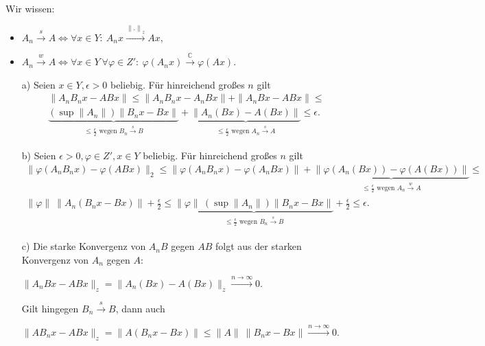 \begin{solution}
\leavevmode \\
  Wir wissen:
\begin{itemize}
    \item $A_n \xrightarrow{s} A \Leftrightarrow \forall x \in Y:~ A_nx \xrightarrow{\mathbb{ \| . \|}_z} Ax,$
    \item $A_n \xrightarrow{w} A \Leftrightarrow \forall x \in Y~ \forall \varphi \in Z':~ \varphi(A_nx) \xrightarrow{\mathbb{C}} \varphi(Ax)$.
\end{itemize}

\begin{itemize}
    \item [a)] Seien $x \in Y, \epsilon > 0$ beliebig. Für hinreichend großes $n$ gilt
    \begin{align*}
        \| A_n B_n x - ABx \| \leq \| A_n B_n x - A_n Bx \| + \| A_n Bx - ABx \| \leq \\
        \underbrace{(\sup{\| A_n \|}) \| B_n x - Bx \|}_{\substack{\leq
        \frac{\epsilon}{2}
        \text{~wegen~} B_n \xrightarrow{s} B}} +
        \underbrace{\| A_n(Bx) - A(Bx) \|}_{\substack{\leq \frac{\epsilon}{2} \text{~wegen~} A_n \xrightarrow{s} A}}
        \leq \epsilon.
    \end{align*}

    \item [b)] Seien $\epsilon > 0, \varphi \in Z', x \in Y$ beliebig. Für hinreichend großes $n$ gilt
    \begin{align*}
        \| \varphi(A_n B_n x) - \varphi(ABx) \|_2
        \leq \| \varphi(A_n B_n x) - \varphi(A_nBx) \|
        +  \underbrace{\| \varphi(A_n (Bx)) - \varphi(A (Bx)) \|}_{\substack{\leq \frac{\epsilon}{2} \text{~wegen~} A_n \xrightarrow{w} A}} \leq \\
        \| \varphi \|~ \| A_n (B_n x - B x) \| + \frac{\epsilon}{2} \leq
        \underbrace{\| \varphi \|~ (\sup{\| A_n \|})
        \| B_n x - Bx \|}_{\substack{\leq \frac{\epsilon}{2} \text{~wegen~} B_n \xrightarrow{s} B}} + \frac{\epsilon}{2} \leq
        \epsilon.
    \end{align*}

    \item [c)]  Die starke Konvergenz von $A_nB$ gegen $AB$ folgt aus der starken Konvergenz von $A_n$ gegen $A$:
    \begin{center} $\| A_n Bx - ABx \|_z = \| A_n(Bx) - A(Bx) \|_z \xrightarrow{n \rightarrow \infty} 0.$ \end{center}
    Gilt hingegen $B_n \xrightarrow{s} B$, dann auch
    \begin{center}
     $\| AB_n x - ABx \|_z = \| A(B_n x - Bx) \| \leq
       \| A \|~ \| B_n x - Bx \| \xrightarrow{n \rightarrow \infty} 0.$
    \end{center}


\end{itemize}
\end{solution}
